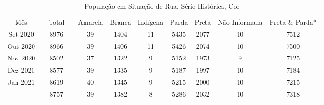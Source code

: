 \documentclass[12pt]{article}
\begin{document}
\begin{landscape}
\pagestyle{empty}
\begin{table}[htbp]
  \centering
  \caption{População em Situação de Rua, Série Histórica, Cor}
  \tabcolsep=0.15cm
	\renewcommand{\arraystretch}{1.0}
	\begin{adjustbox}{max width=\linewidth}
    \begin{tabular}{lllllllllll}
\cmidrule{1-3}\cmidrule{5-11}    \multicolumn{1}{c}{Mês} &      & \multicolumn{1}{c}{Total} &      & \multicolumn{1}{c}{Amarela} & \multicolumn{1}{c}{Branca} & \multicolumn{1}{c}{Indígena} & \multicolumn{1}{c}{Parda} & \multicolumn{1}{c}{Preta} & \multicolumn{1}{c}{Não Informada} & \multicolumn{1}{c}{Preta \& Parda*} \\
\cmidrule{1-3}\cmidrule{5-11}    \multicolumn{1}{c}{Set 2020} &      & \multicolumn{1}{c}{8976} &      & \multicolumn{1}{c}{39} & \multicolumn{1}{c}{1404} & \multicolumn{1}{c}{11} & \multicolumn{1}{c}{5435} & \multicolumn{1}{c}{2077} & \multicolumn{1}{c}{10} & \multicolumn{1}{c}{7512} \\
    \multicolumn{1}{c}{Out 2020} &      & \multicolumn{1}{c}{8966} &      & \multicolumn{1}{c}{39} & \multicolumn{1}{c}{1406} & \multicolumn{1}{c}{11} & \multicolumn{1}{c}{5426} & \multicolumn{1}{c}{2074} & \multicolumn{1}{c}{10} & \multicolumn{1}{c}{7500} \\
    \multicolumn{1}{c}{Nov 2020} &      & \multicolumn{1}{c}{8502} &      & \multicolumn{1}{c}{37} & \multicolumn{1}{c}{1322} & \multicolumn{1}{c}{9} & \multicolumn{1}{c}{5152} & \multicolumn{1}{c}{1973} & \multicolumn{1}{c}{9} & \multicolumn{1}{c}{7125} \\
    \multicolumn{1}{c}{Dez 2020} &      & \multicolumn{1}{c}{8577} &      & \multicolumn{1}{c}{39} & \multicolumn{1}{c}{1335} & \multicolumn{1}{c}{9} & \multicolumn{1}{c}{5187} & \multicolumn{1}{c}{1997} & \multicolumn{1}{c}{10} & \multicolumn{1}{c}{7184} \\
    \multicolumn{1}{c}{Jan 2021} &      & \multicolumn{1}{c}{8619} &      & \multicolumn{1}{c}{40} & \multicolumn{1}{c}{1345} & \multicolumn{1}{c}{9} & \multicolumn{1}{c}{5215} & \multicolumn{1}{c}{2000} & \multicolumn{1}{c}{10} & \multicolumn{1}{c}{7215} \\
    \rowcolor[rgb]{ .851,  .851,  .851} \multicolumn{1}{c}{Fev 2021} &      & \multicolumn{1}{c}{8757} &      & \multicolumn{1}{c}{39} & \multicolumn{1}{c}{1382} & \multicolumn{1}{c}{8} & \multicolumn{1}{c}{5286} & \multicolumn{1}{c}{2032} & \multicolumn{1}{c}{10} & \multicolumn{1}{c}{7318} \\

\end{tabular}
\end{adjustbox}
\end{table}
\end{landscape}
\end{document}
